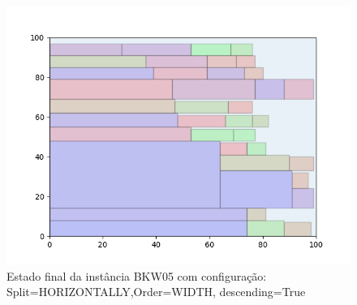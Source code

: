 \begin{figure}[H]
    \centering
    \caption[]{Estado final da instância BKW05 com configuração: Split=HORIZONTALLY,Order=WIDTH, descending=True}
    \label{fig:bkw05-horizontally-width-true}
    \includegraphics[scale=0.5]{output/figures/bkw/bkw05/horizontally/width/true/00}
\end{figure}